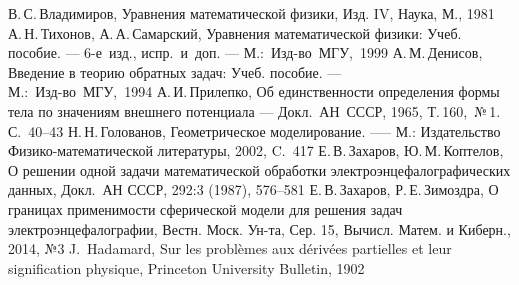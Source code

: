 \documentclass[oneside,final,12pt]{article}
\theoremstyle{definition}
\begin{document}
	
	
	
	\tableofcontents
	\pagebreak
	
	
	
	
	
	
	
	
	
	
	
	
	
	\newpage
	\begin{thebibliography}{99}
		В.\,С.\,Владимиров, Уравнения математической физики, Изд. IV, Наука, М., 1981
		А.\,Н.\,Тихонов, А.\,А.\,Самарский, Уравнения математической физики: Учеб. пособие. --- 6-е~изд., испр.~и~доп. --- М.:~Изд-во~МГУ,~1999
		А.\,М.\,Денисов, Введение в теорию обратных задач: Учеб. пособие. ---\\
		М.:~Изд-во~МГУ,~1994
		А.\,И.\,Прилепко, Об единственности определения формы тела по значениям внешнего потенциала --- Докл.~АН~СССР, 1965, Т.\,160,~№\,1. С.~40--43
		Н.\,Н.\,Голованов, Геометрическое моделирование. --— М.: Издательство Физико-математической литературы, 2002, C.~417
		Е.\,В.\,Захаров, Ю.\,М.\,Коптелов, О решении одной задачи математической обработки электроэнцефалографических данных, Докл.~АН СССР, 292:3 (1987), 576–581
		Е.\,В.\,Захаров, Р.\,Е.\,Зимоздра, О границах применимости сферической модели для решения задач электроэнцефалографии, Вестн. Моск. Ун-та, Сер. 15, Вычисл. Матем. и Киберн., 2014, №3
		J.\, Hadamard, Sur les problèmes aux dérivées partielles et leur signification physique, Princeton University Bulletin, 1902
		
	\end{thebibliography}
\end{document}

